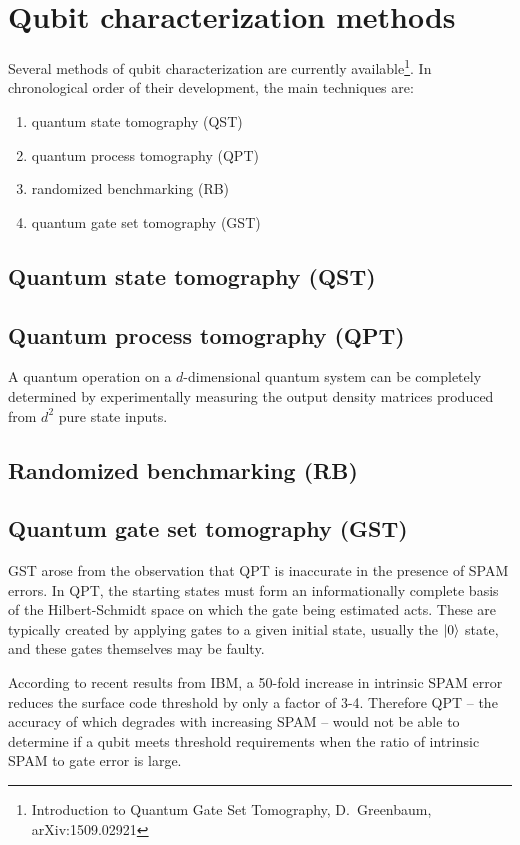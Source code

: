 \documentclass[11pt, oneside]{article}   	%
\begin{document}
\section{Qubit characterization methods}
Several methods of qubit characterization are currently available\footnote{Introduction to Quantum Gate Set Tomography, D.~Greenbaum, arXiv:1509.02921}. 
In chronological order of their development, the main techniques are:
\begin{enumerate}
\item quantum state tomography (QST)
\item quantum process tomography (QPT)
\item randomized benchmarking (RB)
\item quantum gate set tomography (GST)
\end{enumerate}

\subsection{Quantum state tomography (QST)}

\subsection{Quantum process tomography (QPT)}
A quantum operation on a $d$-dimensional quantum system can be completely determined by experimentally measuring the output density matrices produced from $d^2$ pure state inputs.

\subsection{Randomized benchmarking (RB)}

\subsection{Quantum gate set tomography (GST)}

GST arose from the observation that QPT is inaccurate in the presence of SPAM errors. 
In QPT, the starting states must form an informationally complete basis of the Hilbert-Schmidt space on which the gate being estimated acts. 
These are typically created by applying gates to a given initial state, usually the $\ket{0}$ state, and these gates themselves may be faulty.

According to recent results from IBM, a 50-fold increase in intrinsic SPAM error reduces the surface code threshold by only a factor of 3-4. 
Therefore QPT -- the accuracy of which degrades with increasing SPAM -- would not be able to determine if a qubit meets threshold requirements when the ratio of intrinsic SPAM to gate error is large.
\end{document}
